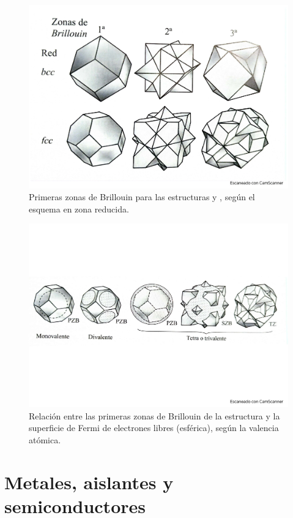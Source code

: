 \begin{figure}[h!] \centering
	\includegraphics[scale=0.35]{Cuerpo/Ch_07/Fotos libro 8.pdf}
	\caption{Primeras zonas de Brillouin para las estructuras \bcc y \fcc, según el esquema en zona reducida.} 
	\label{Fig:07-08}
\end{figure}    
\begin{figure}[h!] \centering
	\includegraphics[scale=0.45]{Cuerpo/Ch_07/Fotos libro 9.pdf}
	\caption{Relación entre las primeras zonas de Brillouin de la estructura \fcc y la superficie de Fermi de electrones libres (esférica), según la valencia atómica.}
	\label{Fig:07-09}
\end{figure}    


\section{Metales, aislantes y semiconductores}

